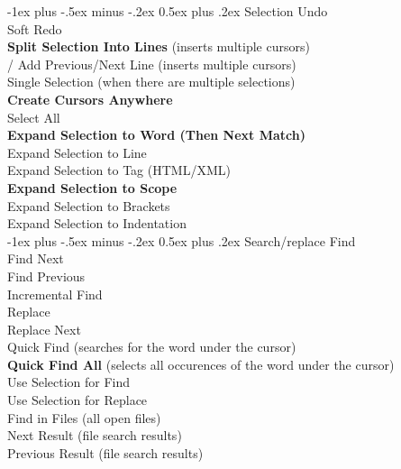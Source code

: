 \documentclass[10pt,landscape]{article}
\makeatletter
\renewcommand{\section}{\@startsection{section}{1}{0mm}%
                                {-1ex plus -.5ex minus -.2ex}%
                                {0.5ex plus .2ex}%
                                {\normalfont\large\bfseries}}
\makeatother
\begin{document}
\begin{multicols}{3}
\section{Selection}
 Undo \\
 Soft Redo \\
 \textbf{Split Selection Into Lines} (inserts multiple cursors) \\
\keys{\ctrl+\shift+\arrowkeyup}/\keys{\arrowkeydown} Add Previous/Next Line (inserts multiple cursors) \\
\keys{\esc} Single Selection (when there are multiple selections) \\
 \textbf{Create Cursors Anywhere} \\
 Select All \\
 \textbf{Expand Selection to Word (Then Next Match)} \\
 Expand Selection to Line \\
 Expand Selection to Tag (HTML/XML) \\
\keys{\cmd+\shift+\space} \textbf{Expand Selection to Scope} \\
 Expand Selection to Brackets \\
 Expand Selection to Indentation \\

\section{Search/replace}
 Find \\
 Find Next \\
 Find Previous \\
 Incremental Find \\
 Replace \\
 Replace Next \\
 Quick Find (searches for the word under the cursor) \\
 \textbf{Quick Find All} (selects all occurences of the word under the cursor) \\
 Use Selection for Find \\
 Use Selection for Replace \\
 Find in Files (all open files) \\
 Next Result (file search results) \\
 Previous Result (file search results)


\end{multicols}
\end{document}
